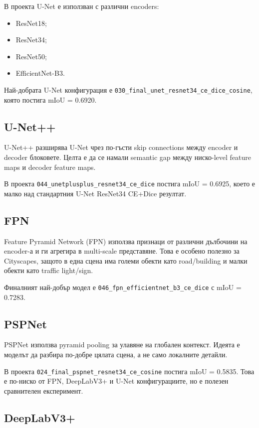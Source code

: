 \documentclass[12pt,a4paper]{article}
\newcommand{\code}[1]{\texttt{#1}}
\begin{document}
В проекта U-Net е използван с различни encoders:

\begin{itemize}
  \item ResNet18;
  \item ResNet34;
  \item ResNet50;
  \item EfficientNet-B3.
\end{itemize}

Най-добрата U-Net конфигурация е \code{030\_final\_unet\_resnet34\_ce\_dice\_cosine}, която постига mIoU = 0.6920.

\subsection{U-Net++}

U-Net++ разширява U-Net чрез по-гъсти skip connections между encoder и decoder блоковете. Целта е да се намали semantic gap между ниско-level feature maps и decoder feature maps.

В проекта \code{044\_unetplusplus\_resnet34\_ce\_dice} постига mIoU = 0.6925, което е малко над стандартния U-Net ResNet34 CE+Dice резултат.

\subsection{FPN}

Feature Pyramid Network (FPN) използва признаци от различни дълбочини на encoder-а и ги агрегира в multi-scale представяне. Това е особено полезно за Cityscapes, защото в една сцена има големи обекти като road/building и малки обекти като traffic light/sign.

Финалният най-добър модел е \code{046\_fpn\_efficientnet\_b3\_ce\_dice} с mIoU = 0.7283.

\subsection{PSPNet}

PSPNet използва pyramid pooling за улавяне на глобален контекст. Идеята е моделът да разбира по-добре цялата сцена, а не само локалните детайли.

В проекта \code{024\_final\_pspnet\_resnet34\_ce\_cosine} постига mIoU = 0.5835. Това е по-ниско от FPN, DeepLabV3+ и U-Net конфигурациите, но е полезен сравнителен експеримент.

\subsection{DeepLabV3+}
\end{document}
